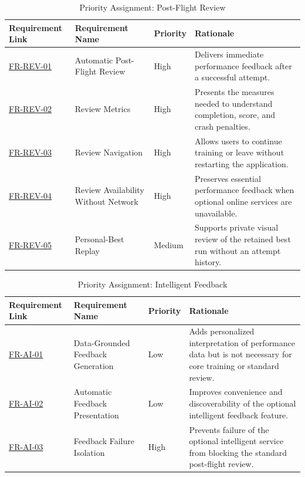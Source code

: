 \documentclass[12pt]{article}
\begin{document}
\begin{table}[htbp]
\centering
\small
\caption{Priority Assignment: Post-Flight Review}
\label{tab:priority-review}
\begin{tabular}{p{2.1cm} p{2.7cm} p{1.3cm} p{7.0cm}}
\hline
\textbf{Requirement Link} & \textbf{Requirement Name} & \textbf{Priority} & \textbf{Rationale} \\
\hline
\hyperref[sec:s2-review]{FR-REV-01} & Automatic Post-Flight Review & High & Delivers immediate performance feedback after a successful attempt. \\
\hyperref[sec:s2-review]{FR-REV-02} & Review Metrics & High & Presents the measures needed to understand completion, score, and crash penalties. \\
\hyperref[sec:s2-review]{FR-REV-03} & Review Navigation & High & Allows users to continue training or leave without restarting the application. \\
\hyperref[sec:s2-review]{FR-REV-04} & Review Availability Without Network & High & Preserves essential performance feedback when optional online services are unavailable. \\
\hyperref[sec:s2-review]{FR-REV-05} & Personal-Best Replay & Medium & Supports private visual review of the retained best run without an attempt history. \\
\hline
\end{tabular}
\end{table}

\begin{table}[htbp]
\centering
\small
\caption{Priority Assignment: Intelligent Feedback}
\label{tab:priority-ai}
\begin{tabular}{p{2.1cm} p{2.7cm} p{1.3cm} p{7.0cm}}
\hline
\textbf{Requirement Link} & \textbf{Requirement Name} & \textbf{Priority} & \textbf{Rationale} \\
\hline
\hyperref[sec:s2-ai]{FR-AI-01} & Data-Grounded Feedback Generation & Low & Adds personalized interpretation of performance data but is not necessary for core training or standard review. \\
\hyperref[sec:s2-ai]{FR-AI-02} & Automatic Feedback Presentation & Low & Improves convenience and discoverability of the optional intelligent feedback feature. \\
\hyperref[sec:s2-ai]{FR-AI-03} & Feedback Failure Isolation & High & Prevents failure of the optional intelligent service from blocking the standard post-flight review. \\
\hline
\end{tabular}
\end{table}
\end{document}

